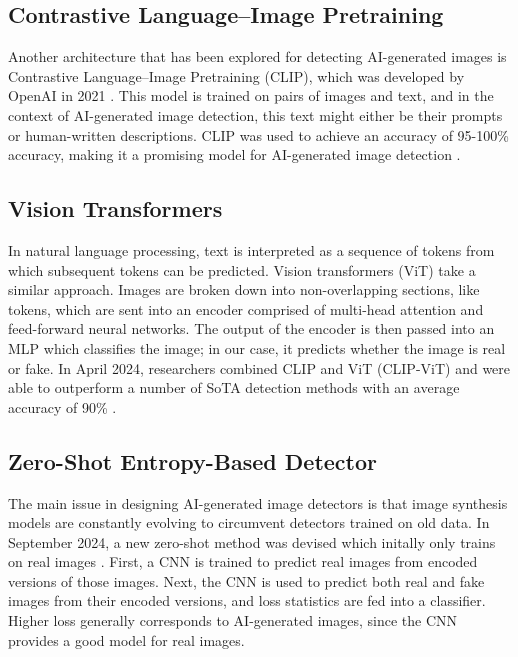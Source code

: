 \documentclass{article} %
\begin{document}
\subsection{Contrastive Language–Image Pretraining}

Another architecture that has been explored for detecting AI-generated images is Contrastive Language–Image Pretraining (CLIP), which was developed by OpenAI in 2021 \citep{radford2021learningtransferablevisualmodels}. This model is trained on pairs of images and text, and in the context of AI-generated image detection, this text might either be their prompts or human-written descriptions. CLIP was used to achieve an accuracy of 95-100\% accuracy, making it a promising model for AI-generated image detection \citep{moskowitz2024detectingaigeneratedimagesclip}.

\subsection{Vision Transformers}

In natural language processing, text is interpreted as a sequence of tokens from which subsequent tokens can be predicted. Vision transformers (ViT) take a similar approach. Images are broken down into non-overlapping sections, like tokens, which are sent into an encoder comprised of multi-head attention and feed-forward neural networks. The output of the encoder is then passed into an MLP which classifies the image; in our case, it predicts whether the image is real or fake. In April 2024, researchers combined CLIP and ViT (CLIP-ViT) and were able to outperform a number of SoTA detection methods with an average accuracy of 90\% \citep{cozzolino2024raisingbaraigeneratedimage}.

\subsection{Zero-Shot Entropy-Based Detector}
\label{ZED}

The main issue in designing AI-generated image detectors is that image synthesis models are constantly evolving to circumvent detectors trained on old data. In September 2024, a new zero-shot method was devised which initally only trains on real images \citep{cozzolino2024zeroshotdetectionaigeneratedimages}. First, a CNN is trained to predict real images from encoded versions of those images. Next, the CNN is used to predict both real and fake images from their encoded versions, and loss statistics are fed into a classifier. Higher loss generally corresponds to AI-generated images, since the CNN provides a good model for real images.
\end{document}
